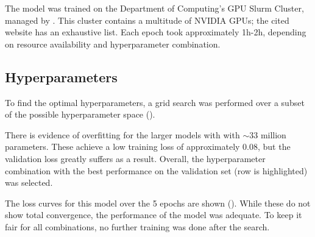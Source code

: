 The model was trained on the Department of Computing's GPU Slurm Cluster,
managed by \citet{csgGPU}. This cluster contains a multitude of NVIDIA GPUs;
the cited website has an exhaustive list. Each epoch took approximately 1h-2h,
depending on resource availability and hyperparameter combination.

\subsection{Hyperparameters}\label{mlS22}

To find the optimal hyperparameters, a grid search was performed over a subset
of the possible hyperparameter space (). 

There is evidence of overfitting for the larger models with with $\sim\!33$
million parameters. These achieve a low training loss of approximately 0.08,
but the validation loss greatly suffers as a result. Overall, the
hyperparameter combination with the best performance on the validation set (row
is highlighted) was selected.

The loss curves for this model over the 5 epochs are shown ().
While these do not show total convergence, the performance of the model was
adequate. To keep it fair for all combinations, no further training was done
after the search.

